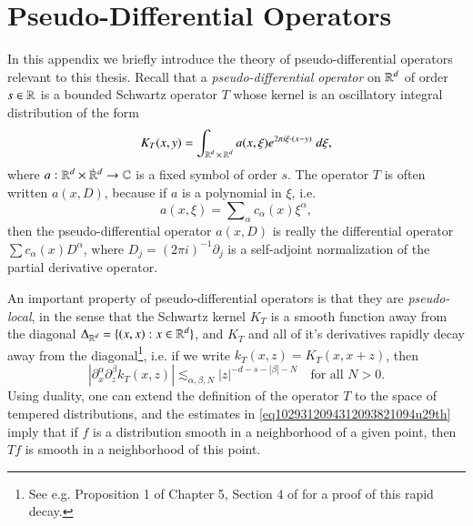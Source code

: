 \renewcommand{\thechapter}{C}
\chapter{Pseudo-Differential Operators} \label{appendixpsueiodjaweiodj}

In this appendix we briefly introduce the theory of pseudo-differential operators relevant to this thesis. Recall that a \emph{pseudo-differential operator} on $\operatorname{\mathbb{R}}^d$ of order $s \in \operatorname{\mathbb{R}}$ is a bounded Schwartz operator $T$ whose kernel is an oscillatory integral distribution of the form
%
\begin{equation}
    K_T(x,y) = \int_{\operatorname{\mathbb{R}}^d \times \operatorname{\mathbb{R}}^d} a(x,\xi) e^{2 \pi i \xi \cdot (x - y)}\; d\xi,
\end{equation}
%
where $a: {\RR^d} \times {\dot{\RR}{\vphantom{\RR}}^d} \to \CC$ is a fixed symbol of order $s$. The operator $T$ is often written $a(x,D)$, because if $a$ is a polynomial in $\xi$, i.e.
%
\begin{equation}
    a(x,\xi) = \sum\nolimits_\alpha c_\alpha(x) \xi^\alpha,
\end{equation}
%
then the pseudo-differential operator $a(x,D)$ is really the differential operator $\sum c_\alpha(x) D^\alpha$, where $D_j = (2\pi i)^{-1} \partial_j$ is a self-adjoint normalization of the partial derivative operator.

An important property of pseudo-differential operators is that they are \emph{pseudo-local}, in the sense that the Schwartz kernel $K_T$ is a smooth function away from the diagonal $\Delta_{\operatorname{\mathbb{R}}^d} = \{ (x,x): x \in \operatorname{\mathbb{R}}^d \}$, and $K_T$ and all of it's derivatives rapidly decay away from the diagonal\footnote{See e.g. Proposition 1 of Chapter 5, Section 4 of \cite{BigStein} for a proof of this rapid decay.}, i.e. if we write $k_T(x,z) = K_T(x,x+z)$, then
%
\begin{equation} \label{eq1029312094312093821094u29th}
    | \partial_x^\alpha \partial_z^\beta k_T(x,z)| \lesssim_{\alpha,\beta,N} |z|^{-d-s-|\beta| - N} \quad\text{for all $N > 0$}.
\end{equation}
%
Using duality, one can extend the definition of the operator $T$ to the space of tempered distributions, and the estimates in \eqref{eq1029312094312093821094u29th} imply that if $f$ is a distribution smooth in a neighborhood of a given point, then $Tf$ is smooth in a neighborhood of this point.
%
%

